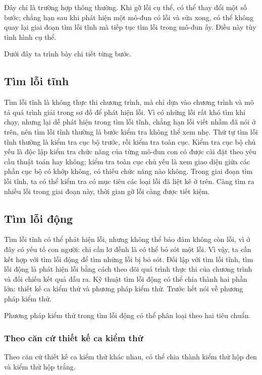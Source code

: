 \documentclass[11pt]{article}
\begin{document}
Đây chỉ là trường hợp thông thường. Khi gỡ lỗi cụ thể, có thể thay đổi một số
bước; chẳng hạn sau khi phát hiện một mô-đun có lỗi và sửa xong, có thể không
quay lại giai đoạn tìm lỗi tĩnh mà tiếp tục tìm lỗi trong mô-đun ấy. Điều này
tùy tình hình cụ thể.

Dưới đây ta trình bày chi tiết từng bước.

\subsection{Tìm lỗi tĩnh}

Tìm lỗi tĩnh là không thực thi chương trình, mà chỉ dựa vào chương trình và
mô tả quá trình giải trong sơ đồ để phát hiện lỗi. Vì có những lỗi rất khó
tìm khi chạy, nhưng lại dễ phát hiện trong tìm lỗi tĩnh, chẳng hạn lỗi viết
nhầm đã nói ở trên, nên tìm lỗi tĩnh thường là bước kiểm tra không thể xem
nhẹ. Thứ tự tìm lỗi tĩnh thường là kiểm tra cục bộ trước, rồi kiểm tra toàn
cục. Kiểm tra cục bộ chủ yếu là độc lập kiểm tra chức năng của từng mô-đun
con có được cài đặt theo yêu cầu thuật toán hay không; kiểm tra toàn cục chủ
yếu là xem giao diện giữa các phần cục bộ có khớp không, có thiếu chức năng
nào không. Trong giai đoạn tìm lỗi tĩnh, ta có thể kiểm tra có mục tiêu các
loại lỗi đã liệt kê ở trên. Càng tìm ra nhiều lỗi trong giai đoạn này, thời
gian gỡ lỗi càng được tiết kiệm.

\subsection{Tìm lỗi động}

Tìm lỗi tĩnh có thể phát hiện lỗi, nhưng không thể bảo đảm không còn lỗi, vì
ở đây có yếu tố con người: chỉ cần lơ đễnh là có thể bỏ sót một lỗi. Vì vậy,
ta cần kết hợp với tìm lỗi động để tìm những lỗi bị bỏ sót. Đối lập với tìm
lỗi tĩnh, tìm lỗi động là phát hiện lỗi bằng cách theo dõi quá trình thực thi
của chương trình và đối chiếu kết quả đầu ra. Kỹ thuật tìm lỗi động có thể
chia thành hai phần lớn: thiết kế ca kiểm thử và phương pháp kiểm thử. Trước
hết nói về phương pháp kiểm thử.

Phương pháp kiểm thử trong tìm lỗi động có thể phân loại theo hai tiêu chuẩn.

\subsubsection{Theo căn cứ thiết kế ca kiểm thử}

Theo căn cứ thiết kế ca kiểm thử khác nhau, có thể chia thành kiểm thử hộp
đen và kiểm thử hộp trắng.
\end{document}
